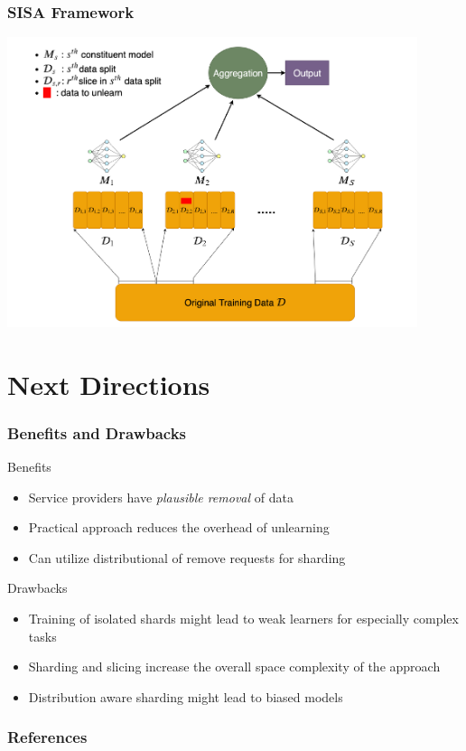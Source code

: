 \documentclass[pdf]{beamer}
\begin{document}
\begin{frame}
  \frametitle{SISA Framework}
  \begin{center}
    \includegraphics[width=0.9\textwidth]{images/SISA.pdf}
  \end{center}
\end{frame}
\section{Next Directions}

\begin{frame}
  \frametitle{Benefits and Drawbacks}
  \begin{block}{Benefits}
    \begin{itemize}
      \item Service providers have \textit{plausible removal} of data
      \item Practical approach reduces the overhead of unlearning
      \item Can utilize distributional of remove requests for sharding
    \end{itemize}
  \end{block}
  \begin{alertblock}{Drawbacks}
    \begin{itemize}
      \item Training of isolated shards might lead to weak learners for especially complex tasks
      \item Sharding and slicing increase the overall space complexity of the approach
      \item Distribution aware sharding might lead to biased models 
    \end{itemize}      
  \end{alertblock}

  

\end{frame}

\begin{frame}[allowframebreaks]
  \frametitle{References}
  
  
\end{frame}
\end{document}
